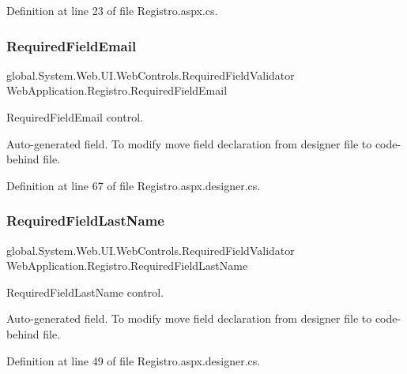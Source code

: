 Definition at line 23 of file Registro.\+aspx.\+cs.

\mbox{\label{classWebApplication_1_1Registro_ae6553f15008ced4083b25fb65ec03307}} 
\subsubsection{\texorpdfstring{RequiredFieldEmail}{RequiredFieldEmail}}
{\footnotesize\ttfamily global.\+System.\+Web.\+U\+I.\+Web\+Controls.\+Required\+Field\+Validator Web\+Application.\+Registro.\+Required\+Field\+Email\hspace{0.3cm}{\ttfamily [protected]}}



Required\+Field\+Email control. 

Auto-\/generated field. To modify move field declaration from designer file to code-\/behind file. 

Definition at line 67 of file Registro.\+aspx.\+designer.\+cs.

\mbox{\label{classWebApplication_1_1Registro_af350e9c84ba34e57d2a8dfd8dfe42ffa}} 
\subsubsection{\texorpdfstring{RequiredFieldLastName}{RequiredFieldLastName}}
{\footnotesize\ttfamily global.\+System.\+Web.\+U\+I.\+Web\+Controls.\+Required\+Field\+Validator Web\+Application.\+Registro.\+Required\+Field\+Last\+Name\hspace{0.3cm}{\ttfamily [protected]}}



Required\+Field\+Last\+Name control. 

Auto-\/generated field. To modify move field declaration from designer file to code-\/behind file. 

Definition at line 49 of file Registro.\+aspx.\+designer.\+cs.

\mbox{\label{classWebApplication_1_1Registro_acf77c4309a5cfd483baffb2dcbfcb83b}} 
